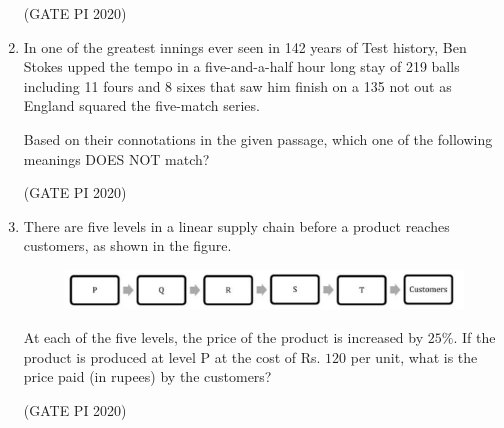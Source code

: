 \documentclass[journal,12pt,onecolumn]{IEEEtran}
\theoremstyle{remark}
\begin{document}
\begin{enumerate}
\hfill (GATE PI 2020)

\item
In one of the greatest innings ever seen in 142 years of Test history, Ben Stokes upped the tempo in a five-and-a-half hour long stay of 219 balls including 11 fours and 8 sixes that saw him finish on a 135 not out as England squared the five-match series.

Based on their connotations in the given passage, which one of the following meanings DOES NOT match?
\begin{enumerate}
\end{enumerate}

\hfill (GATE PI 2020)

\item
There are five levels  in a linear supply chain before a product reaches customers, as shown in the figure.


\begin{figure}[h]
    \centering
    \includegraphics[width=0.5\columnwidth]{figs/fig1.png}
    \caption{}
    \label{fig:placeholder}
\end{figure} 



At each of the five levels, the price of the product is increased by $25\%$. If the product is produced at level P at the cost of Rs. $120$ per unit, what is the price paid (in rupees) by the customers?
\begin{enumerate}
\end{enumerate}

\hfill (GATE PI 2020)


\end{enumerate}
\end{document}
